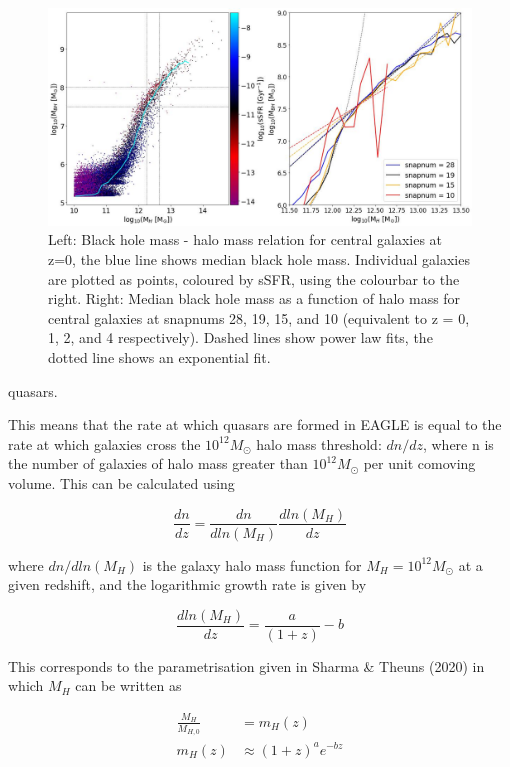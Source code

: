 \documentclass[12pt, twocolumn]{revtex4}    %
\begin{document}
\begin{figure}[H]
\centering
\includegraphics[width=17cm]{Plot_3.jpeg}
\caption{Left: Black hole mass - halo mass relation for central galaxies at z=0, the blue line shows median black hole mass. Individual galaxies are plotted as points, coloured by sSFR, using the colourbar to the right. Right: Median black hole mass as a function of halo mass for central galaxies at snapnums 28, 19, 15, and 10 (equivalent to z = 0, 1, 2, and 4 respectively). Dashed lines show power law fits, the dotted line shows an exponential fit.}
\label{fig:2}
\end{figure}
\twocolumngrid


\noindent quasars.\par

This means that the rate at which quasars are formed in EAGLE is equal to the rate at which galaxies cross the $10^{12}M_\odot$ halo mass threshold: $dn/dz$, where n is the number of galaxies of halo mass greater than $10^{12}M_\odot$ per unit comoving volume. This can be calculated using

\begin{equation}
    \frac{dn}{dz}=\frac{dn}{dln(M_H)}\frac{dln(M_H)}{dz}
\end{equation}

\noindent where $dn/dln(M_H)$ is the galaxy halo mass function for $M_H=10^{12}M_\odot$ at a given redshift, and the logarithmic growth rate is given by

\begin{equation}
    \frac{dln(M_H)}{dz}=\frac{a}{(1+z)}-b
\end{equation}

\noindent This corresponds to the parametrisation given in Sharma \& Theuns (2020) in which $M_H$ can be written as

\begin{align}
    \frac{M_H}{M_{H,0}}&=m_H(z) \nonumber \\
    m_H(z)&\approx(1+z)^ae^{-bz}
\end{align}
\end{document}
